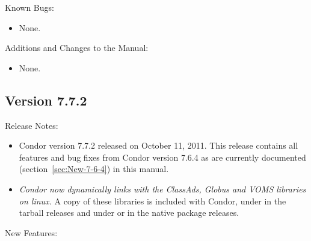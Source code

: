 \noindent Known Bugs:

\begin{itemize}

\item None.

\end{itemize}

\noindent Additions and Changes to the Manual:

\begin{itemize}

\item None.

\end{itemize}


\subsection*{\label{sec:New-7-7-2}Version 7.7.2}

\noindent Release Notes:

\begin{itemize}

\item Condor version 7.7.2 released on October 11, 2011.
This release contains all features and bug fixes from Condor version 7.6.4
as are currently documented (section~\ref{sec:New-7-6-4}) in this manual. 

\item
\emph{Condor now dynamically links with the ClassAds, Globus and VOMS libraries on
linux.}
A copy of these libraries is included with Condor, under
 in the tarball releases and under
 or  in the native package
releases.

\end{itemize}


\noindent New Features:

